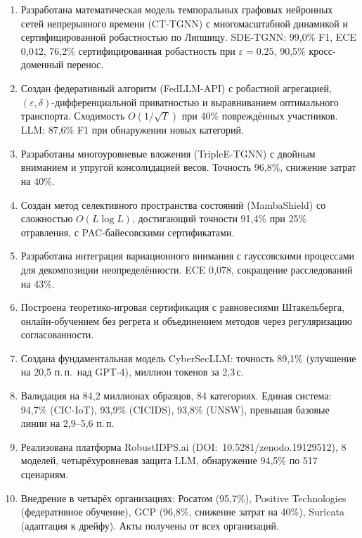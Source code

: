 \documentclass[12pt,a5paper]{article}
\begin{document}
\begin{enumerate}
\item Разработана математическая модель темпоральных графовых нейронных сетей непрерывного времени (CT-TGNN) с многомасштабной динамикой и сертифицированной робастностью по Липшицу. SDE-TGNN: 99,0\% F1, ECE 0,042, 76,2\% сертифицированная робастность при $\varepsilon{=}0.25$, 90,5\% кросс-доменный перенос.

\item Создан федеративный алгоритм (FedLLM-API) с робастной агрегацией, $(\varepsilon, \delta)$-дифференциальной приватностью и выравниванием оптимального транспорта. Сходимость $O(1/\sqrt{T})$ при 40\% повреждённых участников. LLM: 87,6\% F1 при обнаружении новых категорий.

\item Разработаны многоуровневые вложения (TripleE-TGNN) с двойным вниманием и упругой консолидацией весов. Точность 96,8\%, снижение затрат на 40\%.

\item Создан метод селективного пространства состояний (MambaShield) со сложностью $O(L \log L)$, достигающий точности 91,4\% при 25\% отравления, с PAC-байесовскими сертификатами.

\item Разработана интеграция вариационного внимания с гауссовскими процессами для декомпозиции неопределённости. ECE 0,078, сокращение расследований на 43\%.

\item Построена теоретико-игровая сертификация с равновесиями Штакельберга, онлайн-обучением без регрета и объединением методов через регуляризацию согласованности.

\item Создана фундаментальная модель CyberSecLLM: точность 89,1\% (улучшение на 20,5 п.\,п.\ над GPT-4), миллион токенов за 2,3\,с.

\item Валидация на 84,2 миллионах образцов, 84 категориях. Единая система: 94,7\% (CIC-IoT), 93,9\% (CICIDS), 93,8\% (UNSW), превышая базовые линии на 2,9--5,6 п.\,п.

\item Реализована платформа RobustIDPS.ai (DOI:~10.5281/zenodo.19129512), 8 моделей, четырёхуровневая защита LLM, обнаружение 94,5\% по 517 сценариям.

\item Внедрение в четырёх организациях: Росатом (95,7\%), Positive Technologies (федеративное обучение), GCP (96,8\%, снижение затрат на 40\%), Suricata (адаптация к дрейфу). Акты получены от всех организаций.
\end{enumerate}
\end{document}
